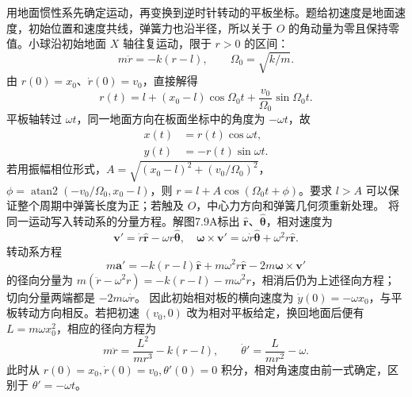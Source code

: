 \documentclass[UTF8,fontset=fandol,a4paper,11pt]{ctexart}
\newcommand{\figcaption}[1]{\par\vspace{2pt}{\small\color{muted}#1}\par}
\begin{document}
\begin{center}\begin{minipage}{\linewidth}\centering{}\figcaption{解图 7.9A}\end{minipage}\end{center}
用地面惯性系先确定运动，再变换到逆时针转动的平板坐标。题给初速度是地面速度，初始位置和速度共线，弹簧力也沿半径，所以关于 $O$ 的角动量为零且保持零值。小球沿初始地面 $X$ 轴往复运动，限于 $r>0$ 的区间：
\[m\ddot r=-k(r-l),\qquad\Omega_0=\sqrt{k/m}.\]
由 $r(0)=x_0$、$\dot r(0)=v_0$，直接解得
\[r(t)=l+(x_0-l)\cos\Omega_0t+\frac{v_0}{\Omega_0}\sin\Omega_0t.\]
平板轴转过 $\omega t$，同一地面方向在板面坐标中的角度为 $-\omega t$，故
\[\boxed{\begin{aligned}
x(t)&=r(t)\cos\omega t,\\
y(t)&=-r(t)\sin\omega t.
\end{aligned}}\]
若用振幅相位形式，$A=\sqrt{(x_0-l)^2+(v_0/\Omega_0)^2}$，$\phi=\operatorname{atan2}(-v_0/\Omega_0,x_0-l)$，则 $r=l+A\cos(\Omega_0t+\phi)$。要求 $l>A$ 可以保证整个周期中弹簧长度为正；若触及 $O$，中心力方向和弹簧几何须重新处理。
将同一运动写入转动系的分量方程。解图7.9A标出 $\hat{\boldsymbol r}$、$\hat{\boldsymbol\theta}$，相对速度为
\[\boldsymbol v'=\dot r\hat{\boldsymbol r}-\omega r\hat{\boldsymbol\theta},\quad
\boldsymbol\omega\times\boldsymbol v'
=\omega\dot r\hat{\boldsymbol\theta}+\omega^2r\hat{\boldsymbol r}.\]
转动系方程
\[m\boldsymbol a'=-k(r-l)\hat{\boldsymbol r}
+m\omega^2r\hat{\boldsymbol r}-2m\boldsymbol\omega\times\boldsymbol v'\]
的径向分量为 $m(\ddot r-\omega^2r)=-k(r-l)-m\omega^2r$，相消后仍为上述径向方程；切向分量两端都是 $-2m\omega\dot r$。
因此初始相对板的横向速度为 $\dot y(0)=-\omega x_0$，与平板转动方向相反。若把初速 $(v_0,0)$ 改为相对平板给定，换回地面后便有 $L=m\omega x_0^2$，相应的径向方程为
\[m\ddot r=\frac{L^2}{mr^3}-k(r-l),\qquad
\dot\theta'=\frac{L}{mr^2}-\omega.\]
此时从 $r(0)=x_0,\dot r(0)=v_0,\theta'(0)=0$ 积分，相对角速度由前一式确定，区别于 $\theta'=-\omega t$。
\end{document}
